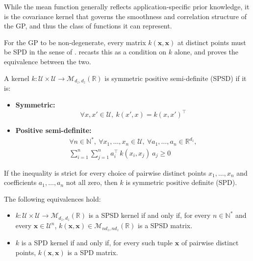 While the mean function generally reflects application-specific prior knowledge, it is the covariance kernel that governs the smoothness and correlation structure of the GP, and thus the class of functions it can represent.

For the GP to be non-degenerate, every matrix $k(\mathbf{x},\mathbf{x})$ at distinct points must be SPD in the sense of .  recasts this as a condition on $k$ alone, and  proves the equivalence between the two.

\begin{definition}\label{th:kernel_SPSD}
	A kernel $k:\mathcal{U}\times\mathcal{U}\to\mathcal{M}_{d_z,d_z}(\mathbb{R})$ is symmetric positive semi-definite (SPSD) if it is:
	\begin{itemize}
		\item\textbf{Symmetric:}
		\begin{equation}
			\forall x,x'\in\mathcal{U},\:k(x',x)=k(x,x')^\top
		\end{equation}
		\item\textbf{Positive semi-definite:}
		\begin{equation}
			\begin{gathered}
			\forall n\in\mathbb{N}^*,\:\forall x_1,\dots,x_n\in\mathcal{U},\:\forall a_1,\dots,a_n\in\mathbb{R}^{d_z},\\
			\sum_{i=1}^n\sum_{j=1}^na_i^\top\:k(x_i,x_j)\:a_j\geq0
			\end{gathered}
		\end{equation}
	\end{itemize}

	If the inequality is strict for every choice of pairwise distinct points $x_1,\dots,x_n$ and coefficients $a_1,\dots,a_n$ not all zero, then $k$ is symmetric positive definite (SPD).
\end{definition}

\begin{proposition}\label{th:kernel_gram_equivalence}
	The following equivalences hold:
	\begin{itemize}
		\item $k:\mathcal{U}\times\mathcal{U}\rightarrow\mathcal{M}_{d_z,d_z}(\mathbb{R})$ is a SPSD kernel if and only if, for every $n\in\mathbb{N}^*$ and every $\mathbf{x}\in\mathcal{U}^n$, $k(\mathbf{x},\mathbf{x})\in\mathcal{M}_{nd_z,nd_z}(\mathbb{R})$ is a SPSD matrix.
		\item $k$ is a SPD kernel if and only if, for every such tuple $\mathbf{x}$ of pairwise distinct points, $k(\mathbf{x},\mathbf{x})$ is a SPD matrix.
	\end{itemize}
\end{proposition}

